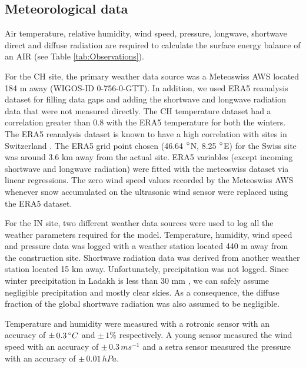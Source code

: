 \documentclass[utf8]{frontiersSCNS}
\begin{document}
\subsection{Meteorological data}

Air temperature, relative humidity, wind speed, pressure, longwave, shortwave direct and diffuse radiation are
required to calculate the surface energy balance of an AIR (see Table \ref{tab:Observations}).

For the CH site, the primary weather data source was a Meteoswiss AWS located 184 m away (WIGOS-ID 0-756-0-GTT).
In addition, we used ERA5 reanalysis dataset \citep{era5} for filling data gaps and adding the shortwave and
longwave radiation data that were not measured directly. The CH temperature dataset had a correlation greater
than 0.8 with the ERA5 temperature for both the winters. The ERA5 reanalysis dataset is known to have a high
correlation with sites in Switzerland \citep{Scherrer_2020}. The ERA5 grid point chosen (46.64 $\degree$N, 8.25
$\degree$E) for the Swiss site was around 3.6 km away from the actual site. ERA5 variables (except incoming
shortwave and longwave radiation) were fitted with the meteoswiss dataset via linear regressions. The zero wind
speed values recorded by the Meteoswiss AWS whenever snow accumulated on the ultrasonic wind sensor were
replaced using the ERA5 dataset.

For the IN site, two different weather data sources were used to log all the weather parameters required for the
model. Temperature, humidity, wind speed and pressure data was logged with a weather station located 440 m away
from the construction site. Shortwave radiation data was derived from another weather station located 15 km
away. Unfortunately, precipitation was not logged. Since winter precipitation in Ladakh is less than 30 mm
\citep{Nusser_2012}, we can safely assume negligible precipitation and mostly clear skies. As a consequence, the
diffuse fraction of the global shortwave radiation was also assumed to be negligible.

Temperature and humidity were measured with a rotronic sensor with an accuracy of $\pm\,0.3\, \degree C$ and
$\pm\,1 \%$ respectively. A young sensor measured the wind speed with an accuracy of $\pm\,0.3\, ms^{-1}$ and a
setra sensor measured the pressure with an accuracy of $\pm\,0.01\, hPa$. 
\end{document}
